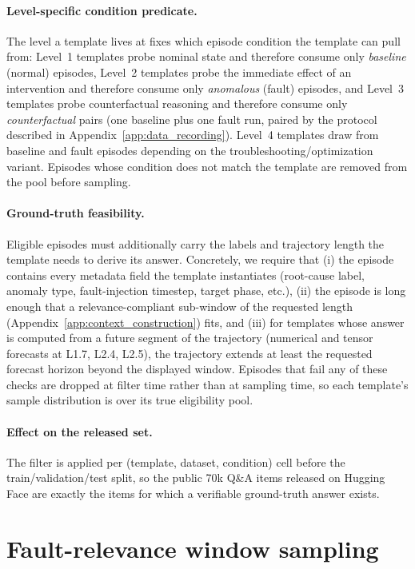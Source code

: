 \documentclass{article}
\begin{document}
\paragraph{Level-specific condition predicate.} The level a template lives at fixes which episode condition the template can pull from: Level~1 templates probe nominal state and therefore consume only \emph{baseline} (normal) episodes, Level~2 templates probe the immediate effect of an intervention and therefore consume only \emph{anomalous} (fault) episodes, and Level~3 templates probe counterfactual reasoning and therefore consume only \emph{counterfactual} pairs (one baseline plus one fault run, paired by the protocol described in Appendix~\ref{app:data_recording}). Level~4 templates draw from baseline and fault episodes depending on the troubleshooting/optimization variant. Episodes whose condition does not match the template are removed from the pool before sampling.

\paragraph{Ground-truth feasibility.} Eligible episodes must additionally carry the labels and trajectory length the template needs to derive its answer. Concretely, we require that (i) the episode contains every metadata field the template instantiates (root-cause label, anomaly type, fault-injection timestep, target phase, etc.), (ii) the episode is long enough that a relevance-compliant sub-window of the requested length (Appendix~\ref{app:context_construction}) fits, and (iii) for templates whose answer is computed from a future segment of the trajectory (numerical and tensor forecasts at L1.7, L2.4, L2.5), the trajectory extends at least the requested forecast horizon beyond the displayed window. Episodes that fail any of these checks are dropped at filter time rather than at sampling time, so each template's sample distribution is over its true eligibility pool.

\paragraph{Effect on the released set.} The filter is applied per (template, dataset, condition) cell before the train/validation/test split, so the public 70k Q\&A items released on Hugging Face are exactly the items for which a verifiable ground-truth answer exists.

\section{Fault-relevance window sampling}
\label{app:relevance}
\end{document}
